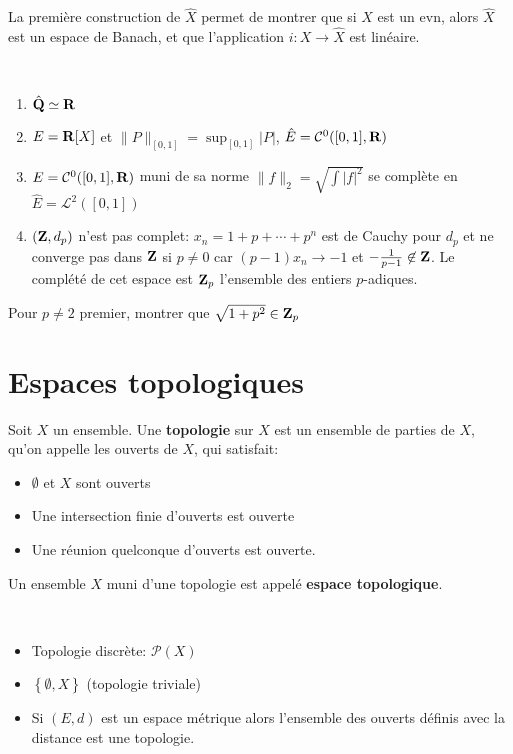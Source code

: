\begin{rem}
La première construction de $\hat{X}$ permet de montrer que si $X$ est un evn, alors $\hat{X}$ est un espace de Banach, et que l'application $i: X \rightarrow \hat{X}$ est linéaire.
\end{rem}

\begin{ex}~
\begin{enumerate}
    \item $ \hat{\mathbf Q}\simeq\mathbf R$
    \item $E=\mathbf R[X]$ et $\|P\|_{[0,1]}=\sup_{[0,1]} |P|$, $ \hat{E}=\mathcal C^0([0, 1], \mathbf R)$
    \item $E=\mathcal  C^0([0, 1], \mathbf R)$ muni de sa norme $\|f\|_2=\sqrt{\int |f|^2 }$ se complète en $ \hat{E}=\mathcal  L^2([0, 1])$
    \item $(\mathbf Z, d_p)$ n'est pas complet: $x_n=1+p+\cdots +p^n$ est de Cauchy pour $d_p$ et ne converge pas dans  $\mathbf Z$ si $p\neq 0$ car  $(p-1)x_n \longrightarrow -1$ et $-\frac{1}{p-1} \not\in \mathbf Z$. Le complété de cet espace est $\mathbf Z_p$ l'ensemble des entiers $p$-adiques.
\end{enumerate}
\end{ex}

\begin{exo}
Pour $p\neq 2$ premier, montrer que  $ \sqrt{1+p^2 } \in  \mathbf Z_p $
\end{exo}

\section{Espaces topologiques}

\begin{dfn}
    Soit $X$ un ensemble. Une \textbf{topologie}  sur  $X$ est un ensemble de parties de  $X$, qu'on appelle les ouverts de  $X$, qui satisfait: \begin{itemize}
        \item $\emptyset$ et  $X$ sont ouverts
        \item Une intersection finie d'ouverts est ouverte
        \item Une réunion quelconque d'ouverts est ouverte.
    \end{itemize}
    Un ensemble $X$ muni d'une topologie est appelé \textbf{espace topologique}.
\end{dfn}

\begin{ex}~
\begin{itemize}
    \item Topologie discrète: $ \mathcal P(X)$
    \item $ \left\{ \emptyset, X \right\} $ (topologie triviale)
    \item Si $(E, d)$ est un espace métrique alors l'ensemble des ouverts définis avec la distance est une topologie.
\end{itemize}
\end{ex}

